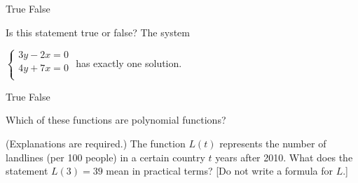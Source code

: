 \documentclass[11pt,answers]{exam}
\begin{document}
\begin{questions}
\begin{parts}
\begin{oneparchoices}
\choice True \choice False
\end{oneparchoices}
\end{parts}

\question[1] Is this statement true or false? The system 

$\begin{cases} 3y-2x=0 \\ 4y+7x=0 \\  \end{cases}$
has exactly one solution.

\begin{oneparchoices}
\choice True \choice False
\end{oneparchoices}

\question

Which of these functions are polynomial functions?

\question[2] (Explanations are required.) The function $L(t)$ represents the number of landlines (per 100 people)  in a certain country $t$ years after 2010. What does the statement $L(3)=39$ mean in practical terms? [Do not write a formula for $L$.]
\fillwithdottedlines{2cm}


\end{questions}
\end{document}
